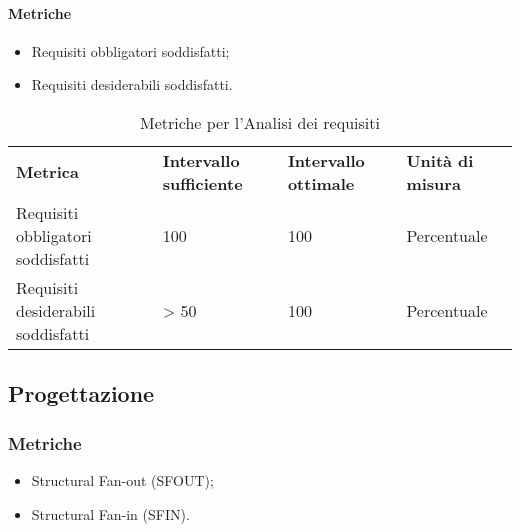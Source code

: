 \paragraph{Metriche}
\begin{itemize}
	\item Requisiti obbligatori soddisfatti;
	\item Requisiti desiderabili soddisfatti.
\end{itemize}
\renewcommand{\arraystretch}{2.2}
\begin{longtable}{|C{4.5cm}|C{2.25cm}|C{2.25cm}|C{3cm}|}

	\caption{Metriche per l'Analisi dei requisiti }\\
	\hline

	\textbf{Metrica} & \textbf{Intervallo sufficiente}  & \textbf{Intervallo ottimale} & \textbf{Unità di misura}
	\tabularnewline
	\endfirsthead

	Requisiti obbligatori soddisfatti &  100 & 100 & Percentuale \\
	Requisiti desiderabili soddisfatti &  > 50 & 100 & Percentuale \\
\end{longtable}
\pagebreak


\subsection{Progettazione}

\subsubsection{Metriche}
\begin{itemize}
	\item Structural Fan-out (SFOUT);
	\item Structural Fan-in (SFIN).
\end{itemize}


